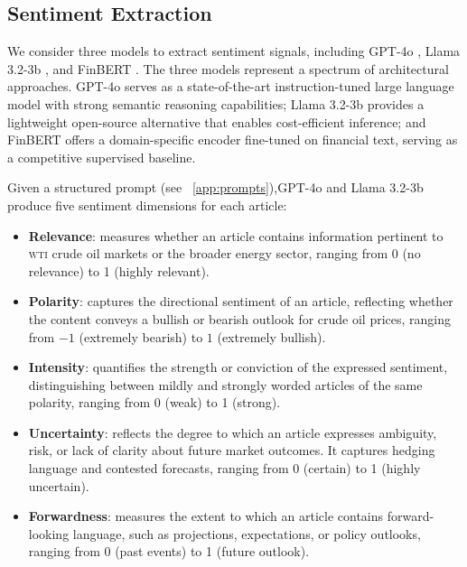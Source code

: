 \documentclass[preprint,12pt,authoryear]{elsarticle}
\newcommand{\wti}{\textsc{wti}}
\newcommand{\gpt}{GPT-4o }
\newcommand{\llama}{Llama 3.2-3b }
\newcommand{\finbert}{FinBERT }
\begin{document}

\subsection{Sentiment Extraction}
\label{SubsecSentiment}
We consider three models to extract sentiment signals, including \gpt 
\citep{achiam2023gpt}, \llama \citep{grattafiori2024llama}, and 
\finbert \citep{huang2023finbert}. The three models represent a 
spectrum of architectural approaches. \gpt serves as a 
state-of-the-art instruction-tuned large language model with strong semantic reasoning capabilities; \llama provides a lightweight open-source alternative that enables cost-efficient inference; and \finbert offers a domain-specific encoder fine-tuned on financial text, serving as a competitive supervised baseline.

Given a structured prompt (see  ~\ref{app:prompts}),\gpt and \llama produce five sentiment dimensions for each article: 
\begin{itemize}
    \item \textbf{Relevance}: measures whether an article contains information pertinent to \wti{} crude oil markets or the broader energy sector, ranging from 0 (no relevance) to 1 (highly relevant).
    
    \item \textbf{Polarity}: captures the directional sentiment of an article, reflecting whether the content conveys a bullish or bearish outlook for crude oil prices, ranging from $-1$ (extremely bearish) to $1$ (extremely bullish).  
    
    \item \textbf{Intensity}: quantifies the strength or conviction of the expressed sentiment, distinguishing between mildly and strongly worded articles of the same polarity, ranging from 0 (weak) to 1 (strong).
    
    \item \textbf{Uncertainty}: reflects the degree to which an article expresses ambiguity, risk, or lack of clarity about future market outcomes. It captures hedging language and contested forecasts, ranging from 0 (certain) to 1 (highly uncertain).
    
    \item \textbf{Forwardness}: measures the extent to which an article contains forward-looking language, such as projections, expectations, or policy outlooks, ranging from 0 (past events) to 1 (future outlook).
    
\end{itemize}
\end{document}
